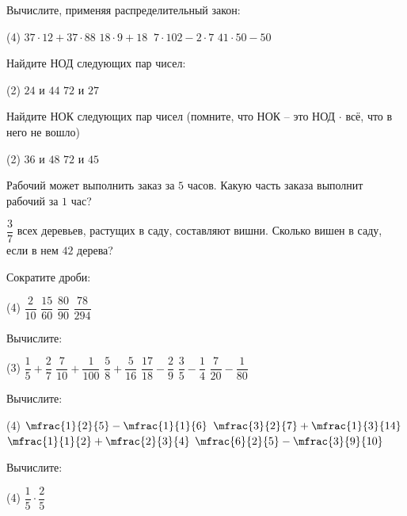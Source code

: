%
\begin{class}[number=6]
	\begin{listofex}
	\item Вычислите, применяя распределительный закон:
	\begin{tasks}(4)
		\itask \( 37\cdot12+37\cdot88 \)
		\task \( 18\cdot9+18\ \)
		\task \( 7\cdot102-2\cdot7 \)
		\task \( 41\cdot50-50 \)
	\end{tasks}
	\item Найдите НОД следующих пар чисел:
	\begin{tasks}(2)
		\task \( 24 \) и \( 44 \)
		\task \( 72 \) и \( 27 \)
	\end{tasks}
	\item Найдите НОК следующих пар чисел (помните, что НОК -- это НОД \( \cdot \) всё, что в него не вошло)
	\begin{tasks}(2)
		\task \( 36 \) и \( 48 \)
		\task \( 72 \) и \( 45 \)
	\end{tasks}
	\item Рабочий может выполнить заказ за \( 5 \) часов. Какую часть заказа выполнит рабочий за \( 1  \) час?
	\item \( \dfrac{3}{7} \) всех деревьев, растущих в саду, составляют вишни. Сколько вишен в саду, если в нем \( 42  \) дерева?
	\item Сократите дроби:
		\begin{tasks}(4)
		\task \( \dfrac{2}{10} \)
		\task \( \dfrac{15}{60} \)
		\task \( \dfrac{80}{90} \)
		\task \( \dfrac{78}{294} \)
	\end{tasks}
	\item Вычислите:
		\begin{tasks}(3)
		\task \( \dfrac{1}{5}+\dfrac{2}{7} \)
		\task \( \dfrac{7}{10}+\dfrac{1}{100} \)
		\task \( \dfrac{5}{8}+\dfrac{5}{16} \)
		\task \( \dfrac{17}{18}-\dfrac{2}{9} \)
		\task \( \dfrac{3}{5}-\dfrac{1}{4} \)
		\task \( \dfrac{7}{20}-\dfrac{1}{80} \)
	\end{tasks}
	\item Вычислите:
		\begin{tasks}(4)
		\task \( \mfrac{1}{2}{5}-\mfrac{1}{1}{6} \)
		\task \( \mfrac{3}{2}{7}+\mfrac{1}{3}{14} \)
		\task \( \mfrac{1}{1}{2}+\mfrac{2}{3}{4} \)
		\task \( \mfrac{6}{2}{5}-\mfrac{3}{9}{10} \)	
	\end{tasks}
	\item Вычислите:
		\begin{tasks}(4)
		\task \( \dfrac{1}{5}\cdot\dfrac{2}{5} \)

\end{tasks}
\end{listofex}
\end{class}
